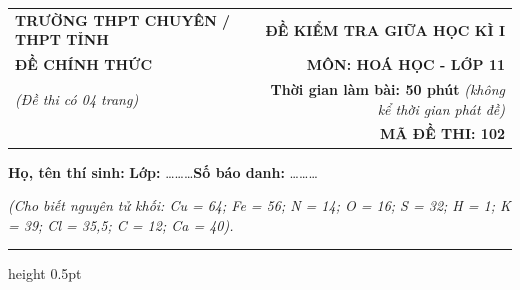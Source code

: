 \documentclass[11pt,a4paper]{article}
\begin{document}
\noindent
\begin{tabularx}{\textwidth}{@{}X r@{}}
\textbf{TRƯỜNG THPT CHUYÊN / THPT TỈNH} & \textbf{ĐỀ KIỂM TRA GIỮA HỌC KÌ I} \\
\textbf{ĐỀ CHÍNH THỨC} & \textbf{MÔN: HOÁ HỌC - LỚP 11} \\
\textit{(Đề thi có 04 trang)} & \textbf{Thời gian làm bài: 50 phút} \textit{(không kể thời gian phát đề)} \\
& \textbf{MÃ ĐỀ THI: 102}
\end{tabularx}

\vspace{2pt}
\noindent\textbf{Họ, tên thí sinh:} \dotfill \textbf{Lớp:} \dots\dots\dots \textbf{Số báo danh:} \dots\dots\dots

\vspace{2pt}
\noindent\textit{(Cho biết nguyên tử khối: Cu = 64; Fe = 56; N = 14; O = 16; S = 32; H = 1; K = 39; Cl = 35,5; C = 12; Ca = 40).}
\vspace{2pt}
\hrule height 0.5pt
\vspace{6pt}

\vspace{4pt}
\end{document}
